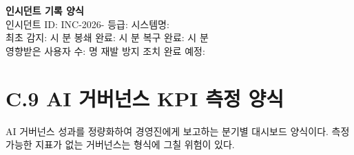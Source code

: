 \begin{tcolorbox}[colback=red!5, colframe=red!70, title={[Template C.8] AI 인시던트 대응 플레이북 (24/72h)}]
\textbf{인시던트 기록 양식}\\
인시던트 ID: INC-2026-\underline{\hspace{1cm}} \quad 등급: \underline{\hspace{1cm}} \quad 시스템명: \underline{\hspace{2cm}} \\
최초 감지: \hspace{1cm}시 \hspace{0.5cm}분 \quad 봉쇄 완료: \hspace{1cm}시 \hspace{0.5cm}분 \quad 복구 완료: \hspace{1cm}시 \hspace{0.5cm}분 \\
영향받은 사용자 수: \underline{\hspace{1cm}}명 \quad 재발 방지 조치 완료 예정: \underline{\hspace{3cm}}
\end{tcolorbox}

\section*{C.9 AI 거버넌스 KPI 측정 양식}

AI 거버넌스 성과를 정량화하여 경영진에게 보고하는 분기별 대시보드 양식이다. 측정 가능한 지표가 없는 거버넌스는 형식에 그칠 위험이 있다.

